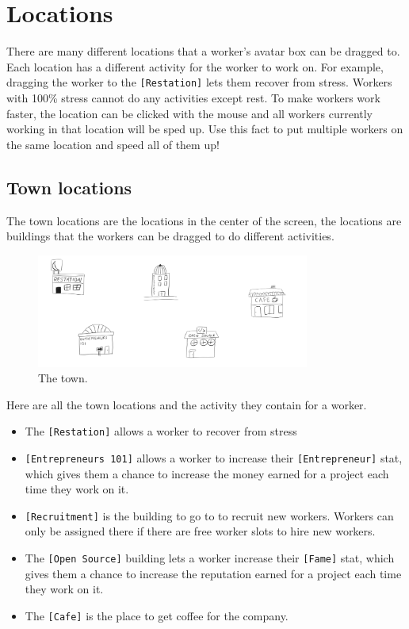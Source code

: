 \documentclass[11pt]{article}
\begin{document}
\section{Locations}
There are many different locations that a worker's avatar box can be dragged to. Each location has a different activity for the worker to work on. For example, dragging the worker to the \texttt{[Restation]} lets them recover from stress. Workers with 100\% stress cannot do any activities except rest. To make workers work faster, the location can be clicked with the mouse and all workers currently working in that location will be sped up. Use this fact to put multiple workers on the same location and speed all of them up!

\subsection{Town locations}
The town locations are the locations in the center of the screen, the locations are buildings that the workers can be dragged to do different activities. 
\begin{figure}[H]
\centering
\includegraphics[width=0.8\textwidth, keepaspectratio]{imgs/town.png}
\caption{The town.}
\end{figure}
\noindent
Here are all the town locations and the activity they contain for a worker.
\begin{itemize}
\item The \texttt{[Restation]} allows a worker to recover from stress
\item \texttt{[Entrepreneurs 101]} allows a worker to increase their \texttt{[Entrepreneur]} stat, which gives them a chance to increase the money earned for a project each time they work on it.
\item \texttt{[Recruitment]} is the building to go to to recruit new workers. Workers can only be assigned there if there are free worker slots to hire new workers.
\item The \texttt{[Open Source]} building lets a worker increase their \texttt{[Fame]} stat, which gives them a chance to increase the reputation earned for a project each time they work on it.
\item The \texttt{[Cafe]} is the place to get coffee for the company.
\end{itemize}
\end{document}
